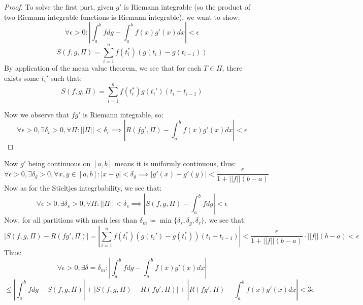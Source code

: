 \documentclass[10pt,letterpaper]{article} %
\begin{document}
\begin{proof}
To solve the first part, given $g'$ is Riemann integrable (so the product of two Riemann integrable functions is Riemann integrable), we want to show:
\begin{equation*}
\forall \epsilon > 0: \left|\int_{a}^{b}fdg - \int_{a}^{b}f(x)g'(x)dx\right| < \epsilon
\end{equation*}
\begin{equation*}
S(f, g, \Pi) = \sum_{i=1}^{n}f(t_i^*)(g(t_i) - g(t_{i-1}))
\end{equation*}
By application of the mean value theorem, we see that for each $T \in \Pi$, there exists some $t_i'$ such that:
\begin{equation*}
S(f, g, \Pi) = \sum_{i=1}^{n}f(t_i^*)g(t_i')(t_i - t_{i-1})
\end{equation*}

Now we observe that $fg'$ is Riemann integrable, so:
\begin{equation*}
\forall \epsilon > 0, \exists \delta_r > 0, \forall \Pi: ||\Pi|| < \delta_r \implies \left|R(fg', \Pi) - \int_{a}^{b}f(x)g'(x)dx\right| < \epsilon
\end{equation*}
\end{proof}
Now $g'$ being continuous on $[a, b]$ means it is uniformly continuous, thus:
\begin{equation*}
\forall \epsilon > 0, \exists \delta_g > 0, \forall x, y \in [a, b]: |x-y| < \delta_g \implies |g'(x) - g'(y)| < \frac{\epsilon}{1 + ||f||(b-a)}
\end{equation*}
Now as for the Stieltjes integrbability, we see that:
\begin{equation*}
\forall \epsilon > 0, \exists \delta_s > 0 , \forall \Pi: ||\Pi|| < \delta_s \implies \left|S(f, g, \Pi) - \int_{a}^{b}fdg\right| < \epsilon
\end{equation*}
Now, for all partitions with mesh less than $\delta_m \coloneq \min\{\delta_s, \delta_g, \delta_r\}$, we see that:
\begin{equation*}
|S(f, g, \Pi) - R(fg', \Pi)| = \left|\sum_{i=1}^{n}f(t_i^*)(g(t_i') - g(t_i^*))(t_i - t_{i-1})\right| < \frac{\epsilon}{1 + ||f||(b-a)} \cdot ||f||(b-a) < \epsilon
\end{equation*}
Thus:
\begin{equation*}
\forall \epsilon > 0, \exists \delta = \delta_m: \left|\int_{a}^{b}fdg - \int_{a}^{b}f(x)g'(x)dx\right|
\end{equation*}
\begin{equation*}
 \leqslant \left|\int_{a}^{b}fdg - S(f, g, \Pi)\right| + |S(f, g, \Pi) - R(fg', \Pi)| + \left|R(fg', \Pi) - \int_{a}^{b}f(x)g'(x)dx\right| < 3\epsilon
\end{equation*}
\end{document}
